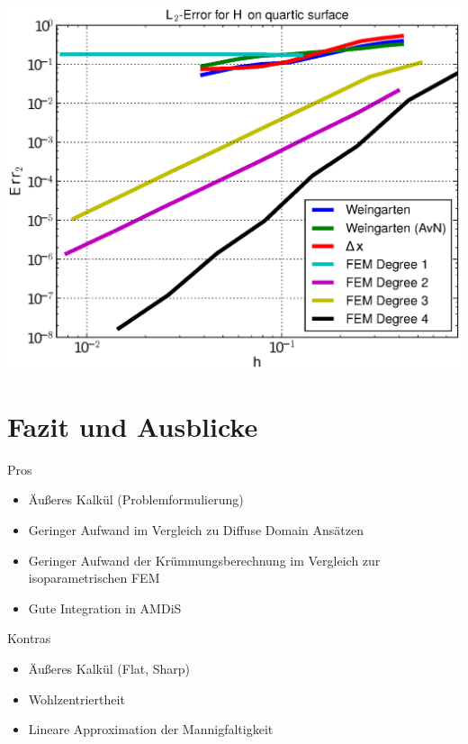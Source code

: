\documentclass[handout]{beamer}
\begin{document}
\begin{frame}
\begin{overprint}
\begin{minipage}[t]{0.49\textwidth}
            \centering\includegraphics[width=\textwidth]{bilder/Curvature/heineB/ErrHL2_7.eps}
          \end{minipage}
    \end{overprint}
  \end{frame}

\section{Fazit und Ausblicke}

  \begin{frame}
    \begin{block}{Pros}
      \begin{itemize}
        \item Äußeres Kalkül (Problemformulierung)
        \item Geringer Aufwand im Vergleich zu Diffuse Domain Ansätzen 
        \item Geringer Aufwand der Krümmungsberechnung im Vergleich zur isoparametrischen FEM
        \item Gute Integration in AMDiS
      \end{itemize}
    \end{block}
    \pause
    \begin{block}{Kontras}
      \begin{itemize}
        \item Äußeres Kalkül (Flat, Sharp)
        \item Wohlzentriertheit
        \item Lineare Approximation der Mannigfaltigkeit
      \end{itemize}
    \end{block}
  \end{frame}
\end{document}
